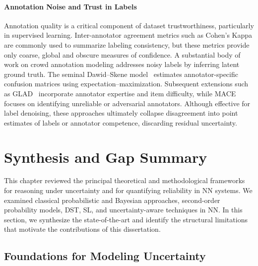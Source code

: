 \paragraph{Annotation Noise and Trust in Labels}
Annotation quality is a critical component of dataset trustworthiness, particularly in supervised learning. Inter-annotator agreement metrics such as Cohen’s Kappa are commonly used to summarize labeling consistency, but these metrics provide only coarse, global and obscure measures of confidence. A substantial body of work on crowd annotation modeling addresses noisy labels by inferring latent ground truth. The seminal Dawid--Skene model~\cite{dawid1979maximum} estimates annotator-specific confusion matrices using expectation--maximization. Subsequent extensions such as GLAD~\cite{whitehill2009whose} incorporate annotator expertise and item difficulty, while MACE~\cite{hovy2013learning} focuses on identifying unreliable or adversarial annotators. Although effective for label denoising, these approaches ultimately collapse disagreement into point estimates of labels or annotator competence, discarding residual uncertainty.

\section{Synthesis and Gap Summary}
\label{sec:gap_summary}

This chapter reviewed the principal theoretical and methodological frameworks
for reasoning under uncertainty and for quantifying reliability in \acf{NN} systems. We examined classical probabilistic and Bayesian approaches, second-order probability models, \acf{DST}, \acf{SL}, and uncertainty-aware techniques in \ac{NN}. In this section, we synthesize the state-of-the-art and identify the
structural limitations that motivate the contributions of this dissertation.

\subsection*{Foundations for Modeling Uncertainty}


